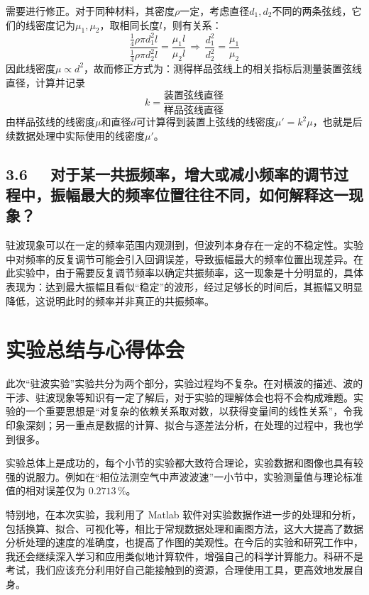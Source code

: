 \documentclass[UTF8]{article}
\theoremstyle{MyLineTheoremStyle} %
\theoremstyle{MyBlockTheoremStyle} %
\theoremstyle{MySubsubsectionStyle} %
\begin{document}
需要进行修正。对于同种材料，其密度$ \rho $一定，考虑直径$ d_1,d_2 $不同的两条弦线，它们的线密度记为$ \mu_1,\mu_2 $，取相同长度$ l $，则有关系：
\begin{equation}
\frac{\frac{1}{4}\rho\pi d_1^2l}{\frac{1}{4} \rho\pi d_2^2l}=\frac{\mu_1l}{\mu_2l}\,\Longrightarrow\,\frac{d_1^2}{d_2^2}=\frac{\mu_1}{\mu_2}
\end{equation}
因此线密度$ \mu\propto d^2 $，故而修正方式为：测得样品弦线上的相关指标后测量装置弦线直径，计算并记录
\begin{equation}
    k=\frac{\text{装置弦线直径}}{\text{样品弦线直径}} 
\end{equation}
由样品弦线的线密度$ \mu $和直径$ d $可计算得到装置上弦线的线密度$ \mu'=k^2\mu $，也就是后续数据处理中实际使用的线密度$ \mu' $。


\subsection*{3.6 \ \  对于某一共振频率，增大或减小频率的调节过程中，振幅最大的频率位置往往不同，如何解释这一现象？}
驻波现象可以在一定的频率范围内观测到，但波列本身存在一定的不稳定性。实验中对频率的反复调节可能会引入回调误差，导致振幅最大的频率位置出现差异。在此实验中，由于需要反复调节频率以确定共振频率，这一现象是十分明显的，具体表现为：达到最大振幅且看似“稳定”的波形，经过足够长的时间后，其振幅又明显降低，这说明此时的频率并非真正的共振频率。

\section{实验总结与心得体会}
此次“驻波实验”实验共分为两个部分，实验过程均不复杂。在对横波的描述、波的干涉、驻波现象等知识有一定了解后，对于实验的理解体会也将不会构成难题。实验的一个重要思想是“对复杂的依赖关系取对数，以获得变量间的线性关系”，令我印象深刻；另一重点是数据的计算、拟合与逐差法分析，在处理的过程中，我也学到很多。

实验总体上是成功的，每个小节的实验都大致符合理论，实验数据和图像也具有较强的说服力。例如在“相位法测空气中声波波速”一小节中，实验测量值与理论标准值的相对误差仅为 $0.2713 \, \%$。

特别地，在本次实验，我利用了 Matlab 软件对实验数据作进一步的处理和分析，包括换算、拟合、可视化等，相比于常规数据处理和画图方法，这大大提高了数据分析处理的速度的准确度，也提高了作图的美观性。在今后的实验和研究工作中，我还会继续深入学习和应用类似地计算软件，增强自己的科学计算能力。科研不是考试，我们应该充分利用好自己能接触到的资源，合理使用工具，更高效地发展自身。
\end{document}
